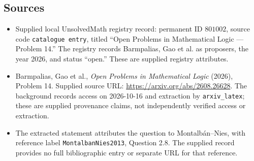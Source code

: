 \documentclass[11pt]{article}
\begin{document}
\subsection{Sources}
\begin{itemize}
\item Supplied local UnsolvedMath registry record: permanent ID \(801002\), source code \texttt{catalogue entry}, titled ``Open Problems in Mathematical Logic --- Problem 14.'' The registry records Barmpalias, Gao et al. as proposers, the year 2026, and status ``open.'' These are supplied registry attributes.
\item Barmpalias, Gao et al., \emph{Open Problems in Mathematical Logic} (2026), Problem 14. Supplied source URL: \url{https://arxiv.org/abs/2608.26628}. The background records access on 2026-10-16 and extraction by \texttt{arxiv\_latex}; these are supplied provenance claims, not independently verified access or extraction.
\item The extracted statement attributes the question to Montalb\'an--Nies, with reference label \texttt{MontalbanNies2013}, Question 2.8. The supplied record provides no full bibliographic entry or separate URL for that reference.
\end{itemize}
\end{document}
